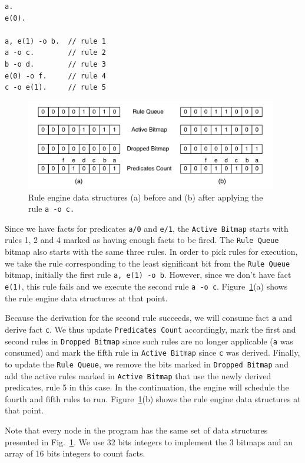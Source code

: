 \documentclass{sigplanconf}
\begin{document}
{\footnotesize
\begin{Verbatim}
a.
e(0).

a, e(1) -o b.  // rule 1
a -o c.        // rule 2
b -o d.        // rule 3
e(0) -o f.     // rule 4
c -o e(1).     // rule 5
\end{Verbatim}
}

\begin{figure}[t]
\centering
\includegraphics[width=11cm]{figures/rule_queue.pdf}
\caption{Rule engine data structures (a) before and (b) after applying 
  the rule \texttt{a -o c.}}
\label{fig:rule_engine}
\end{figure}

Since we have facts for predicates \texttt{a/0} and \texttt{e/1},
the \texttt{Active Bitmap} starts with rules 1, 2 and 4 marked as
having enough facts to be fired. The \texttt{Rule Queue} bitmap also
starts with the same three rules. In order to pick rules for
execution, we take the rule corresponding to the least significant bit
from the \texttt{Rule Queue} bitmap, initially the first
rule \texttt{a, e(1) -o b}. However, since we don't have
fact \texttt{e(1)}, this rule fails and we execute the second
rule \texttt{a -o c}. Figure~\ref{fig:rule_engine}(a) shows the rule
engine data structures at that point.

Because the derivation for the second rule succeeds, we will consume
fact \texttt{a} and derive fact \texttt{c}. We thus update
\texttt{Predicates Count} accordingly, mark the first 
and second rules in \texttt{Dropped Bitmap} since such rules are no
longer applicable (\texttt{a} was consumed) and mark the fifth rule
in \texttt{Active Bitmap} since \texttt{c} was derived. Finally, to
update the \texttt{Rule Queue}, we remove the bits marked
in \texttt{Dropped Bitmap} and add the active rules marked
in \texttt{Active Bitmap} that use the newly derived predicates, rule
5 in this case. In the continuation, the engine will schedule the
fourth and fifth rules to run. Figure~\ref{fig:rule_engine}(b) shows
the rule engine data structures at that point.

Note that every node in the program has the same set of data
structures presented in Fig.~\ref{fig:rule_engine}. We use 32 bits
integers to implement the 3 bitmaps and an array of 16 bits integers to
count facts.
\end{document}
